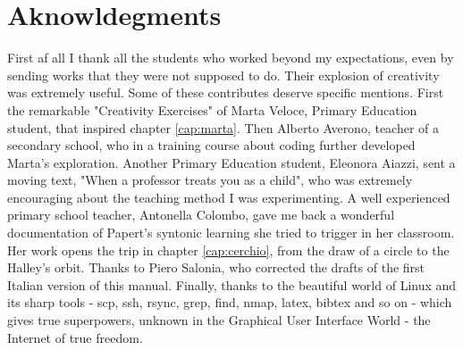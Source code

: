 \tableofcontents
\newpage

\section{Aknowldegments}

First af all I thank all the students who worked beyond my expectations, even
by sending works that they were not supposed to do. Their explosion of
creativity was extremely useful. Some of these contributes deserve specific
mentions. First the remarkable "Creativity Exercises" of Marta Veloce, Primary
Education student, that inspired chapter \ref{cap:marta}. Then Alberto Averono,
teacher of a secondary school, who in a training course about coding further
developed Marta's exploration. Another Primary Education student, Eleonora
Aiazzi, sent a moving text, "When a professor treats you as a child", who was
extremely encouraging about the teaching method I was experimenting. A well
experienced primary school teacher, Antonella Colombo, gave me back a wonderful
documentation of Papert's syntonic learning she tried to trigger in her
classroom. Her work opens the trip in chapter \ref{cap:cerchio}, from the draw
of a circle to the Halley's orbit. Thanks to Piero Salonia, who corrected the
drafts of the first Italian version of this manual. Finally, thanks to the
beautiful world of Linux and its sharp tools  - scp, ssh, rsync, grep, find,
nmap, latex, bibtex and so on - which gives true superpowers, unknown in the
Graphical User Interface World - the Internet of true freedom.


